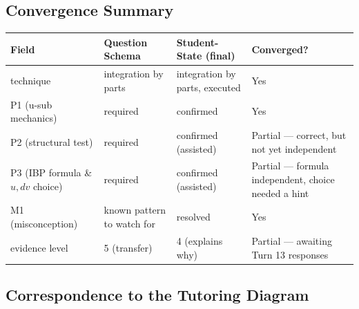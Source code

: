 \documentclass[11pt]{article}
\begin{document}
\subsection{Convergence Summary}

\begin{center}
\begin{tabularx}{\linewidth}{P{3.6cm} P{3.6cm} P{3.6cm} P{1.8cm}}
\toprule
\textbf{Field} & \textbf{Question Schema} & \textbf{Student-State (final)} & \textbf{Converged?} \\
\midrule
technique & integration by parts & integration by parts, executed & Yes \\
P1 (u-sub mechanics) & required & confirmed & Yes \\
P2 (structural test) & required & confirmed (assisted) & Partial --- correct, but not yet independent \\
P3 (IBP formula \& $u,dv$ choice) & required & confirmed (assisted) & Partial --- formula independent, choice needed a hint \\
M1 (misconception) & known pattern to watch for & resolved & Yes \\
evidence level & 5 (transfer) & 4 (explains why) & Partial --- awaiting Turn 13 responses \\
\bottomrule
\end{tabularx}
\end{center}

\subsection{Correspondence to the Tutoring Diagram}
\end{document}
